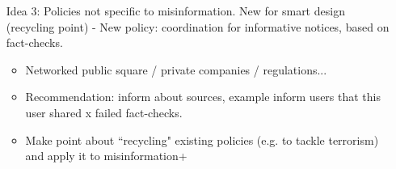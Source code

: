 \documentclass{article}
\begin{document}
{\begin{itemize}
%		
%		
%			
%	
	
\item[Idea 3:] Policies not specific to misinformation. New for smart design (recycling point) - New policy: coordination for informative notices, based on fact-checks.

	\begin{itemize}
	
		\item Networked public square / private companies / regulations... 
	
		\item Recommendation: inform about sources, example inform users that this user shared x failed fact-checks. 
		
		\item Make point about ``recycling" existing policies (e.g. to tackle terrorism) and apply it to misinformation+ 
		

\end{itemize}
\end{itemize}}
\end{document}

